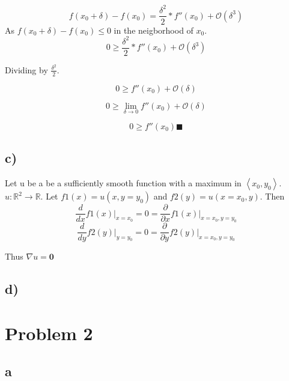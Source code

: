 \documentclass{article}
\begin{document}
\begin{equation*}
    f(x_{0}+\delta) - f(x_{0}) = \frac{\delta^2}{2}*f''(x_{0}) + \mathcal{O}(\delta^3)
\end{equation*}
 As $f(x_{0}+\delta) - f(x_{0}) \leq 0$ in the neigborhood of $x_{0}$.
\begin{equation*}
    0 \geq \frac{\delta^2}{2}*f''(x_{0}) + \mathcal{O}(\delta^3)
\end{equation*}

Dividing by $\frac{\delta^2}{2}$.

\begin{equation*}
    0 \geq f''(x_{0}) + \mathcal{O}(\delta)
\end{equation*}

\begin{equation*}
    0 \geq \lim_{\delta \to 0} f''(x_{0}) + \mathcal{O}(\delta)
\end{equation*}

\begin{equation*}
    0 \geq f''(x_{0}) \blacksquare
\end{equation*}

\subsection{c)}
Let u be a be a sufficiently smooth function with a maximum in $ \left<x_{0}, y_{0}\right> $.$ u: \mathbb{R}^{2} \to \mathbb{R} $.
Let $f1(x) = u(x,y=y_{0})$ and $f2(y) = u(x=x_{0},y)$. Then
\begin{equation*}
    \frac{d}{dx}f1(x)\bigg|_{x=x_{0}} = 0 = \frac{\partial}{\partial x}f1(x)\bigg|_{x=x_{0},y=y_{0}}
\end{equation*}{}
\begin{equation*}
    \frac{d}{dy}f2(y)\bigg|_{y=y_{0}} = 0 = \frac{\partial}{\partial y}f2(y)\bigg|_{x=x_{0},y=y_{0}}
\end{equation*}{}

Thus $\nabla u = \mathbf{0}$

\subsection{d)}


\newpage
\section{Problem 2}
\subsection{a}
\end{document}
